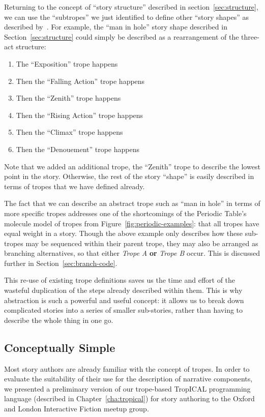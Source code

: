 \documentclass[11pt]{report}
\begin{document}
Returning to the concept of ``story structure'' described in
section~\ref{sec:structure}, we can use the ``subtropes'' we just identified to
define other ``story shapes'' as described by~\citet{vonnegut2009palm}. For example, the ``man
in hole'' story shape described in Section~\ref{sec:structure} could simply be described as a rearrangement of the
three-act structure:

\begin{enumerate}
  \item The ``Exposition'' trope happens
  \item Then the ``Falling Action'' trope happens
  \item Then the ``Zenith'' trope happens
  \item Then the ``Rising Action'' trope happens
  \item Then the ``Climax'' trope happens
  \item Then the ``Denouement'' trope happens
\end{enumerate}

Note that we added an additional trope, the ``Zenith'' trope to describe the
lowest point in the story. Otherwise, the rest of the story ``shape'' is easily
described in terms of tropes that we have defined already.

The fact that we can describe an abstract trope such as ``man in hole'' in terms
of more specific tropes addresses one of the shortcomings of the Periodic
Table's molecule model of tropes from Figure~\ref{fig:periodic-examples}: that
all tropes have equal weight in a story. Though the above example only describes
how these sub-tropes may be sequenced within their parent trope, they may also
be arranged as branching alternatives, so that either \emph{Trope A} \textbf{or}
\emph{Trope B} occur. This is discussed further in Section~\ref{sec:branch-code}.

This re-use of existing trope definitions saves us the time and effort of the wasteful duplication of the steps
already described within them. This is why abstraction is such a powerful
and useful concept: it allows us to break down complicated stories into a series
of smaller sub-stories, rather than having to describe the whole thing in one go.

\subsection{Conceptually Simple}\label{sec:tropes-simple}

Most story authors are already familiar with the concept of tropes. In order to
evaluate the suitability of their use for the description of narrative
components, we presented a preliminary version of our trope-based TropICAL programming
language (described in Chapter~\ref{cha:tropical}) for story authoring to the Oxford and London Interactive Fiction meetup group.
\end{document}
